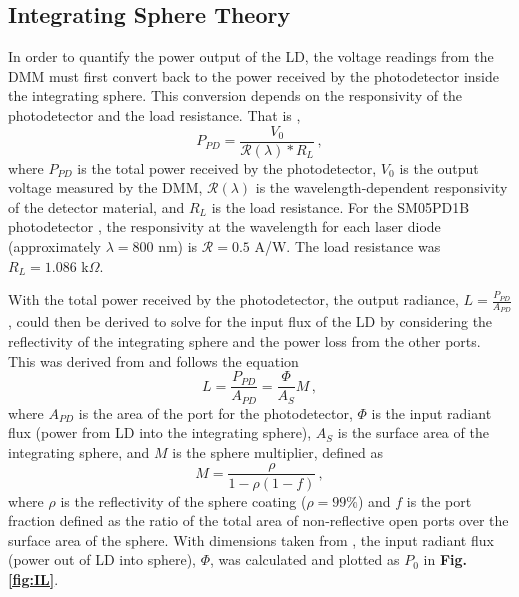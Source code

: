 \documentclass[9pt,twocolumn,twoside]{osajnl}
\begin{document}
\subsection*{Integrating Sphere Theory}
\indent \indent In order to quantify the power output of the LD, the voltage readings from the DMM must first convert back to the power received by the photodetector inside the integrating sphere. This conversion depends on the responsivity of the photodetector and the load resistance. That is \cite{ThorlabsPD},
\begin{equation}
    P_{PD}=\frac{V_0}{\mathcal{R}(\lambda)* R_L} \,,
\end{equation}
where $P_{PD}$ is the total power received by the photodetector, $V_0$ is the output voltage measured by the DMM, $\mathcal{R}(\lambda)$ is the wavelength-dependent responsivity of the detector material, and $R_L$ is the load resistance. For the SM05PD1B photodetector \cite{ThorlabsPD}, the responsivity at the wavelength for each laser diode (approximately $\lambda = 800$ nm) is $\mathcal{R}=0.5$ A/W. The load resistance was $R_L=1.086$ k$\Omega$. 

With the total power received by the photodetector, the output radiance, $L=\frac{P_{PD}}{A_{PD}}$, could then be derived to solve for the input flux of the LD by considering the reflectivity of the integrating sphere and the power loss from the other ports. This was derived from \cite{durell} and follows the equation
\begin{equation}
    L=\frac{P_{PD}}{A_{PD}}=\frac{\Phi}{A_S}M \,,
\end{equation}
where $A_{PD}$ is the area of the port for the photodetector, $\Phi$ is the input radiant flux (power from LD into the integrating sphere), $A_S$ is the surface area of the integrating sphere, and $M$ is the sphere multiplier, defined as
\begin{equation}
    M=\frac{\rho}{1-\rho(1-f)} \,,
\end{equation}
where $\rho$ is the reflectivity of the sphere coating ($\rho=99\%$) and $f$ is the port fraction defined as the ratio of the total area of non-reflective open ports over the surface area of the sphere. With dimensions taken from \cite{IntSphere, ThorlabsPD}, the input radiant flux (power out of LD into sphere), $\Phi$, was calculated and plotted as $P_0$ in \textbf{Fig. \ref{fig:IL}}.


\newpage
\end{document}
